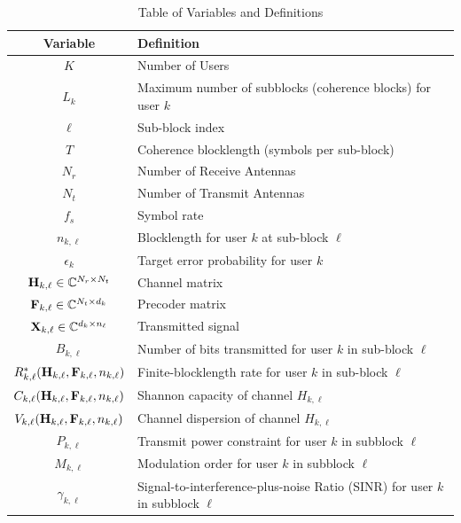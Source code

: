 \documentclass[a4paper, 12pt, onecolumn, journal, twoside, draftclsnofoot]{IEEEtran}
\begin{document}
\begin{table}[H]
\centering
\caption{Table of Variables and Definitions}
\begin{tabular}{|c|l|}
\hline
\textbf{Variable} & \textbf{Definition} \\ \hline
$K$ & Number of Users \\ \hline
$L_k$ & Maximum number of subblocks (coherence blocks) for user $k$ \\ \hline
$\ell$ & Sub-block index \\ \hline
$T$ & Coherence blocklength (symbols per sub-block) \\ \hline
$N_r$ & Number of Receive Antennas \\ \hline
$N_t$ & Number of Transmit Antennas \\ \hline
$f_s$ & Symbol rate \\ \hline
$n_{k,\ell}$ & Blocklength for user $k$ at sub-block $\ell$ \\ \hline
$\epsilon_k$ & Target error probability for user $k$ \\ \hline

${\bf H}_{k,\ell} \in \mathbb{C}^{N_r \times N_t}$ & Channel matrix \\ \hline
${\bf F}_{k,\ell} \in \mathbb{C}^{N_t \times d_k}$ & Precoder matrix \\ \hline
${\bf X}_{k,\ell} \in \mathbb{C}^{d_k \times n_\ell}$ & Transmitted signal \\ \hline

$B_{k, \ell}$ & Number of bits transmitted for user $k$ in sub-block $\ell$ \\ \hline
$R^*_{k,\ell}({\bf H}_{k,\ell}, {\bf F}_{k,\ell}, n_{k,\ell})$ & Finite-blocklength rate for user $k$ in sub-block $\ell$ \\ \hline
$C_{k,\ell}({\bf H}_{k,\ell}, {\bf F}_{k,\ell}, n_{k,\ell})$ & Shannon capacity of channel $H_{k,\ell}$ \\ \hline
$V_{k,\ell}({\bf H}_{k,\ell}, {\bf F}_{k,\ell}, n_{k,\ell})$ & Channel dispersion of channel $H_{k,\ell}$ \\ \hline
$P_{k,\ell}$ & Transmit power constraint for user $k$ in subblock $\ell$ \\ \hline
$M_{k,\ell}$ & Modulation order for user $k$ in subblock $\ell$ \\ \hline
$\gamma_{k,\ell}$ & Signal-to-interference-plus-noise Ratio (SINR) for user $k$ in subblock $\ell$ \\ \hline
\end{tabular}
\label{tab:variables_sim}
\end{table}
\end{document}
